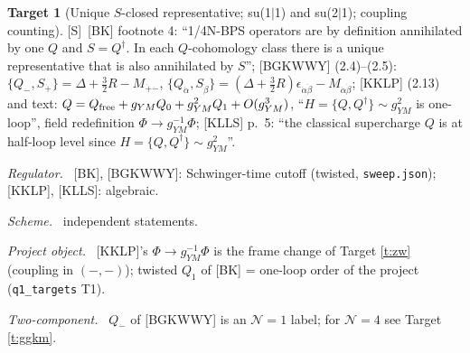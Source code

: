 \documentclass[11pt]{article}
\theoremstyle{definition}
\newtheorem{target}{Target}
\newcommand{\Sl}{\textup{[S]}}
\newcommand{\fld}[1]{\par\textit{#1.}\ }
\begin{document}
\begin{target}[Unique $S$-closed representative; su(1$|$1) and su(2$|$1); coupling counting]\label{t:bk}
\Sl\ [BK] footnote 4: ``1/4N-BPS operators are by definition annihilated by one $Q$ and $S=Q^\dagger$. In each $Q$-cohomology class there is a unique representative that is also annihilated by $S$''; [BGKWWY] (2.4)--(2.5): $\{Q_{\dot-},S_{\dot+}\}=\Delta+\tfrac32R-M_{\dot+\dot-}$, $\{Q_{\dot\alpha},S_{\dot\beta}\}=(\Delta+\tfrac32R)\epsilon_{\dot\alpha\dot\beta}-M_{\dot\alpha\dot\beta}$; [KKLP] (2.13) and text: $Q=Q_{\rm free}+g_{YM}Q_0+g_{YM}^2Q_1+O(g^3_{YM})$, ``$H=\{Q,Q^\dagger\}\sim g_{YM}^2$ is one-loop'', field redefinition $\Phi\to g_{YM}^{-1}\Phi$; [KLLS] p.~5: ``the classical supercharge $Q$ is at half-loop level since $H=\{Q,Q^\dagger\}\sim g^2_{YM}$''.
\fld{Regulator} [BK], [BGKWWY]: Schwinger-time cutoff (twisted, \texttt{sweep.json}); [KKLP], [KLLS]: algebraic. \fld{Scheme} independent statements.
\fld{Project object} [KKLP]'s $\Phi\to g^{-1}_{YM}\Phi$ is the frame change of Target \ref{t:zw} (coupling in $(-,-)$); twisted $Q_1$ of [BK] = one-loop order of the project (\texttt{q1\_targets} T1).
\fld{Two-component} $Q_{\dot-}$ of [BGKWWY] is an $\mathcal N=1$ label; for $\mathcal N=4$ see Target \ref{t:ggkm}.
\end{target}
\end{document}
